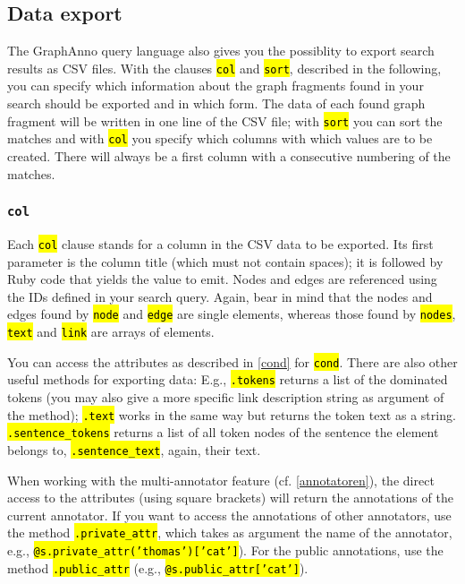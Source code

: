 \documentclass[12pt]{scrartcl}
\newcommand{\code}[1]{\hl{\texttt{#1}}}
\begin{document}
\subsection{Data export}

The GraphAnno query language also gives you the possiblity to export search results as CSV files.
With the clauses \code{col} and \code{sort}, described in the following, you can specify which information about the graph fragments found in your search should be exported and in which form.
The data of each found graph fragment will be written in one line of the CSV file; with \code{sort} you can sort the matches and with \code{col} you specify which columns with which values are to be created.
There will always be a first column with a consecutive numbering of the matches.


\subsubsection{\texttt{col}}

Each \code{col} clause stands for a column in the CSV data to be exported.
Its first parameter is the column title (which must not contain spaces); it is followed by Ruby code that yields the value to emit.
Nodes and edges are referenced using the IDs defined in your search query.
Again, bear in mind that the nodes and edges found by \code{node} and \code{edge} are single elements, whereas those found by \code{nodes}, \code{text} and \code{link} are arrays of elements.

You can access the attributes as described in \ref{cond} for \code{cond}.
There are also other useful methods for exporting data:
E.g., \code{.tokens} returns a list of the dominated tokens (you may also give a more specific link description string as argument of the method); \code{.text} works in the same way but returns the token text as a string.
\code{.sentence\_tokens} returns a list of all token nodes of the sentence the element belongs to, \code{.sentence\_text}, again, their text.

When working with the multi-annotator feature (cf. \ref{annotatoren}), the direct access to the attributes (using square brackets) will return the annotations of the current annotator.
If you want to access the annotations of other annotators, use the method \mbox{\code{.private\_attr}}, which takes as argument the name of the annotator,\\e.g., \code{@s.private\_attr('thomas')['cat']}).
For the public annotations, use the method \code{.public\_attr} (e.g., \code{@s.public\_attr['cat']}).
\end{document}

